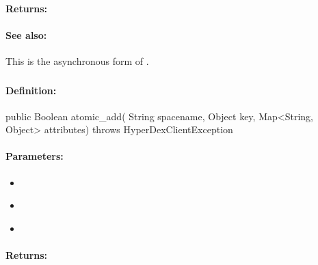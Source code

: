 \paragraph{Returns:}


\paragraph{See also:}  This is the asynchronous form of .

\pagebreak
\subsubsection{}
\label{api:java:atomic_add}


\paragraph{Definition:}
\begin{javacode}
public Boolean atomic_add(
        String spacename,
        Object key,
        Map<String, Object> attributes) throws HyperDexClientException
\end{javacode}

\paragraph{Parameters:}
\begin{itemize}[noitemsep]
\item {}\\

\item {}\\

\item {}\\

\end{itemize}

\paragraph{Returns:}


